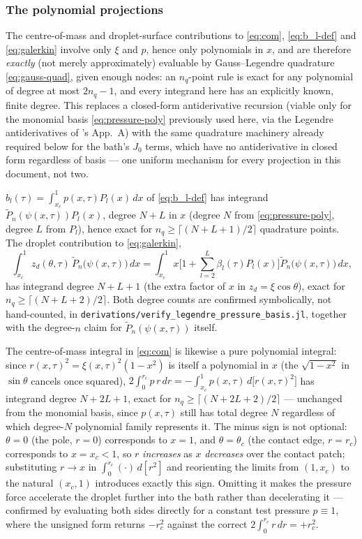 \subsubsection{The polynomial projections}
\label{subsubsec:polynomial-projections}
The centre-of-mass and droplet-surface contributions to \eqref{eq:com}, \eqref{eq:b_l-def} and \eqref{eq:galerkin} involve only $\xi$ and $p$, hence only polynomials in $x$, and are therefore \emph{exactly} (not merely approximately) evaluable by Gauss--Legendre quadrature \eqref{eq:gauss-quad}, given enough nodes: an $n_q$-point rule is exact for any polynomial of degree at most $2n_q-1$, and every integrand here has an explicitly known, finite degree. This replaces a closed-form antiderivative recursion (viable only for the monomial basis \eqref{eq:pressure-poly} previously used here, via the Legendre antiderivatives of \cite{AgueroEtAl2026}'s App.~A) with the same quadrature machinery already required below for the bath's $J_0$ terms, which have no antiderivative in closed form regardless of basis --- one uniform mechanism for every projection in this document, not two.

$b_l(\tau)=\int_{x_c}^1p(x,\tau)P_l(x)\,dx$ of \eqref{eq:b_l-def} has integrand $\tilde P_n(\psi(x,\tau))P_l(x)$, degree $N+L$ in $x$ (degree $N$ from \eqref{eq:pressure-poly}, degree $L$ from $P_l$), hence exact for $n_q\ge\lceil(N+L+1)/2\rceil$ quadrature points. The droplet contribution to \eqref{eq:galerkin},
\begin{equation}
    \int_{x_c}^1z_d(\theta,\tau)\,\tilde P_n\big(\psi(x,\tau)\big)\,dx
    = \int_{x_c}^1x\Big[1+\sum_{l=2}^L\beta_l(\tau)P_l(x)\Big]\tilde P_n\big(\psi(x,\tau)\big)\,dx\text{,}
    \label{eq:drop-galerkin-term}
\end{equation}
has integrand degree $N+L+1$ (the extra factor of $x$ in $z_d=\xi\cos\theta$), exact for $n_q\ge\lceil(N+L+2)/2\rceil$. Both degree counts are confirmed symbolically, not hand-counted, in \texttt{derivations/verify\_legendre\_pressure\_basis.jl}, together with the degree-$n$ claim for $\tilde P_n(\psi(x,\tau))$ itself.

The centre-of-mass integral in \eqref{eq:com} is likewise a pure polynomial integral: since $r(x,\tau)^2=\xi(x,\tau)^2(1-x^2)$ is itself a polynomial in $x$ (the $\sqrt{1-x^2}$ in $\sin\theta$ cancels once squared), $2\int_0^{r_c}p\,r\,dr=-\int_{x_c}^1p(x,\tau)\,d\big[r(x,\tau)^2\big]$ has integrand degree $N+2L+1$, exact for $n_q\ge\lceil(N+2L+2)/2\rceil$ --- unchanged from the monomial basis, since $p(x,\tau)$ still has total degree $N$ regardless of which degree-$N$ polynomial family represents it. The minus sign is not optional: $\theta=0$ (the pole, $r=0$) corresponds to $x=1$, and $\theta=\theta_c$ (the contact edge, $r=r_c$) corresponds to $x=x_c<1$, so $r$ \emph{increases} as $x$ \emph{decreases} over the contact patch; substituting $r\to x$ in $\int_0^{r_c}(\cdot)\,d[r^2]$ and reorienting the limits from $(1,x_c)$ to the natural $(x_c,1)$ introduces exactly this sign. Omitting it makes the pressure force accelerate the droplet further into the bath rather than decelerating it — confirmed by evaluating both sides directly for a constant test pressure $p\equiv1$, where the unsigned form returns $-r_c^2$ against the correct $2\int_0^{r_c}r\,dr=+r_c^2$.

